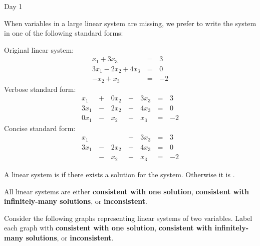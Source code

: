 \begin{applicationActivities}{Day 1}
\begin{remark}
  When variables in a large linear system are missing, we prefer to
  write the system in one of the following standard forms:

  \begin{multicols}{3}\noindent
    Original linear system:
    \begin{alignat*}{2}
       x_1 + 3x_3 &\,=\,& 3 \\
      3x_1 - 2x_2 + 4x_3 &\,=\,& 0 \\
      -x_2 +  x_3 &\,=\,& -2
    \end{alignat*}
    Verbose standard form:
    \begin{alignat*}{4}
       x_1 &\,+\,& 0x_2 &\,+\,& 3x_3 &\,=\,& 3 \\
      3x_1 &\,-\,& 2x_2 &\,+\,& 4x_3 &\,=\,& 0 \\
      0x_1 &\,-\,&  x_2 &\,+\,&  x_3 &\,=\,& -2
    \end{alignat*}
    Concise standard form:
    \begin{alignat*}{4}
       x_1 &     &      &\,+\,& 3x_3 &\,=\,& 3 \\
      3x_1 &\,-\,& 2x_2 &\,+\,& 4x_3 &\,=\,& 0 \\
           &\,-\,&  x_2 &\,+\,&  x_3 &\,=\,& -2
    \end{alignat*}
  \end{multicols}
\end{remark}

\begin{definition}
  A linear system is  if there exists a solution for the
  system. Otherwise it is .
\end{definition}

\begin{fact}
  All linear systems are either \textbf{consistent with one solution},
  \textbf{consistent with infinitely-many solutions}, or
  \textbf{inconsistent}.
\end{fact}

\begin{activity}
  Consider the following graphs representing linear systems of two variables.
  Label each graph with \textbf{consistent with one solution},
  \textbf{consistent with infinitely-many solutions}, or
  \textbf{inconsistent}.
  \begin{multicols}{4}
  \begin{center}
    \systemWithInfinitelyManySolutions
    \systemWithOneSolutionB
    \systemWithNoSolutions
    \systemWithOneSolutionA
  \end{center}
  \end{multicols}
\end{activity}


\end{applicationActivities}
